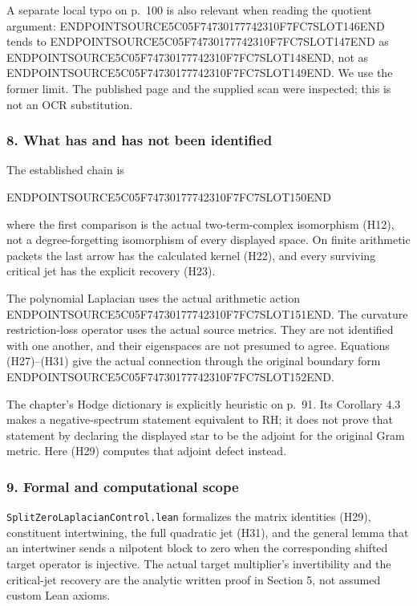 A separate local typo on p.~100 is also relevant when reading the quotient argument: ENDPOINTSOURCE5C05F74730177742310F7FC7SLOT146END tends to ENDPOINTSOURCE5C05F74730177742310F7FC7SLOT147END as ENDPOINTSOURCE5C05F74730177742310F7FC7SLOT148END, not as ENDPOINTSOURCE5C05F74730177742310F7FC7SLOT149END. We use the former limit. The published page and the supplied scan were inspected; this is not an OCR substitution.

\subsubsection{8. What has and has not been identified}\label{endpoint-cc_hochschild--what-has-and-has-not-been-identified}

The established chain is

ENDPOINTSOURCE5C05F74730177742310F7FC7SLOT150END

where the first comparison is the actual two-term-complex isomorphism (H12), not a degree-forgetting isomorphism of every displayed space. On finite arithmetic packets the last arrow has the calculated kernel (H22), and every surviving critical jet has the explicit recovery (H23).

The polynomial Laplacian uses the actual arithmetic action ENDPOINTSOURCE5C05F74730177742310F7FC7SLOT151END. The curvature restriction-loss operator uses the actual source metrics. They are not identified with one another, and their eigenspaces are not presumed to agree. Equations (H27)--(H31) give the actual connection through the original boundary form ENDPOINTSOURCE5C05F74730177742310F7FC7SLOT152END.

The chapter's Hodge dictionary is explicitly heuristic on p.~91. Its Corollary 4.3 makes a negative-spectrum statement equivalent to RH; it does not prove that statement by declaring the displayed star to be the adjoint for the original Gram metric. Here (H29) computes that adjoint defect instead.

\subsubsection{9. Formal and computational scope}\label{endpoint-cc_hochschild--formal-and-computational-scope}

\texttt{SplitZeroLaplacianControl.lean} formalizes the matrix identities (H29), constituent intertwining, the full quadratic jet (H31), and the general lemma that an intertwiner sends a nilpotent block to zero when the corresponding shifted target operator is injective. The actual target multiplier's invertibility and the critical-jet recovery are the analytic written proof in Section 5, not assumed custom Lean axioms.


